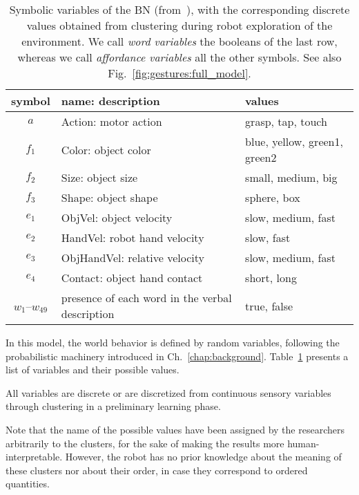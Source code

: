 \begin{table}
    \centering
    \caption[Symbolic variables of the \AffWords{} \acl{BN}.]{Symbolic variables of the \AffWords{} \acl{BN} (from~\cite{salvi:2012:smcb}), with the corresponding discrete values obtained from clustering during robot exploration of the environment.
    We call \emph{word variables} the booleans of the last row, whereas we call \emph{affordance variables} all the other symbols.
    See also Fig.~\ref{fig:gestures:full_model}.}
    \label{tab:salvi:bnsymb}
    \begin{tabular}{cp{3.7cm}l}
    \toprule
    symbol & name: description     & values \\
    \midrule
    $a$ & Action: motor action          & grasp, tap, touch \\
    \midrule
    $f_1$ & Color: object color   & blue, yellow, green1, green2 \\
    $f_2$ & Size: object size     & small, medium, big \\
    $f_3$ & Shape: object shape    & sphere, box \\
    \midrule
    $e_1$ & ObjVel: object velocity & slow, medium, fast \\
    $e_2$ & HandVel: robot hand velocity & slow, fast \\
    $e_3$ & ObjHandVel: relative \objecthand{} velocity & slow, medium, fast \\
    $e_4$ & Contact: object hand contact & short, long \\
    \midrule
    $w_1$--$w_{49}$ & presence of each word in the verbal description & true, false \\
    \bottomrule
    \end{tabular}
\end{table}

In this \AffWords{} model, the world behavior is defined by random variables, following the probabilistic machinery introduced in Ch.~\ref{chap:background}.
Table~\ref{tab:salvi:bnsymb} presents a list of variables and their possible values.

All variables are discrete or are discretized from continuous sensory variables through clustering in a preliminary learning phase.

Note that the name of the possible values have been assigned by the researchers arbitrarily to the clusters, for the sake of making the results more human-interpretable.
However, the robot has no prior knowledge about the meaning of these clusters nor about their order, in case they correspond to ordered quantities.

